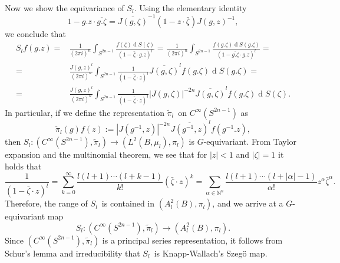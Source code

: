 \documentclass[a4paper,reqno]{amsart}
\numberwithin{equation}{section}
\def\rd{\operatorname{d}\!}
\def\N{\mathbb{N}}
\theoremstyle{definition}
\theoremstyle{remark}
\begin{document}
Now we show the equivariance of $S_l$. Using the elementary identity 
$$1-g.z\cdot \overline{g.\zeta}=\overline{J(g,\zeta)}^{-1}(1-z\cdot \bar\zeta)J(g,z)^{-1},$$
we conclude that 
\begin{align*}
S_lf(g.z)=&\frac{1}{(2\pi i)^n}\int_{S^{2n-1}} \frac{f(\zeta)\rd S(\zeta)}{(1-\bar{\zeta}\cdot g.z)^l}=\frac{1}{(2\pi i)^n}\int_{S^{2n-1}} \frac{f(g.\zeta)\rd S(g.\zeta)}{(1-\overline{g.\zeta}\cdot g.z)^l}=\\
=&\frac{J(g,z)^l}{(2\pi i)^n}\int_{S^{2n-1}} \frac{1}{(1-\overline{\zeta}\cdot z)^l}\overline{J(g,\zeta)}^{l}f(g.\zeta)\rd S(g.\zeta)=\\
=&\frac{J(g,z)^l}{(2\pi i)^n}\int_{S^{2n-1}} \frac{1}{(1-\overline{\zeta}\cdot z)^l}|J(g,\zeta)|^{-2n}\overline{J(g,\zeta)}^{l}f(g.\zeta)\rd S(\zeta).
\end{align*}
In particular, if we define the representation $\tilde{\pi}_l$ on $C^\infty(S^{2n-1})$ as
$$\tilde{\pi}_l(g)f(z):=|J(g^{-1},z)|^{-2n}\overline{J(g^{-1},z)}^{l}f(g^{-1}.z),$$
then $S_l:(C^\infty(S^{2n-1}),\tilde{\pi}_l)\to (L^2(B,\mu_l),\pi_l)$ is $G$-equivariant. From Taylor expansion and the multinomial theorem, we see that for $|z|<1$ and $|\zeta|=1$ it holds that 
\begin{equation}
\label{kernelexap}
\frac{1}{(1-\bar{\zeta}\cdot z)^l}=\sum_{k=0}^\infty \frac{l(l+1)\cdots (l+k-1)}{k!} (\bar{\zeta}\cdot z)^k=\sum_{\alpha\in \N^n} \frac{l(l+1)\cdots (l+|\alpha|-1)}{\alpha!}z^\alpha\bar{\zeta}^\alpha. 
\end{equation}
Therefore, the range of $S_l$ is contained in $(A^2_l(B),\pi_l)$, and we arrive at a $G$-equivariant map 
$$S_l:(C^\infty(S^{2n-1}),\tilde{\pi}_l)\to (A^2_l(B),\pi_l).$$
Since $(C^\infty(S^{2n-1}),\tilde{\pi}_l)$ is a principal series representation, it follows from Schur's lemma and irreducibility that $S_l$ is Knapp-Wallach's Szegö map. 
\end{document}

